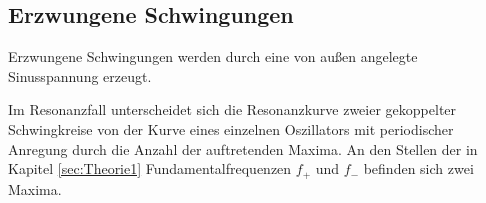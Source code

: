 \subsection{Erzwungene Schwingungen}
\label{sec:erzwungen}
Erzwungene Schwingungen werden durch eine von außen angelegte Sinusspannung erzeugt.

Im Resonanzfall unterscheidet sich die Resonanzkurve zweier gekoppelter Schwingkreise von der Kurve eines einzelnen Oszillators mit periodischer Anregung durch die Anzahl der auftretenden Maxima. An den Stellen der in Kapitel \ref{sec:Theorie1} Fundamentalfrequenzen $f_+$ und $f_-$ befinden sich zwei Maxima.
